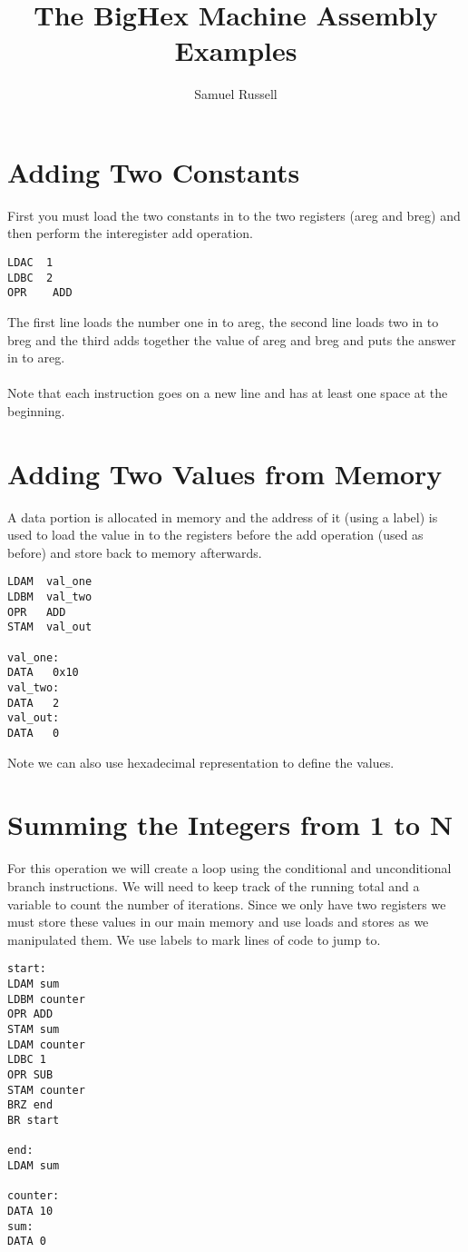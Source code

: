 \documentclass[10pt,a4paper]{article}
\author{Samuel Russell}
\title{The BigHex Machine Assembly Examples}
\begin{document}
\maketitle

\section{Adding Two Constants}

First you must load the two constants in to the two registers (areg and breg) and then perform the interegister add operation. 
\\
\begin{lstlisting}[frame=single]
LDAC  1
LDBC  2
OPR    ADD
\end{lstlisting}

The first line loads the number one in to areg, the second line loads two in to breg and the third adds together the value of areg and breg and puts the answer in to areg.
\\\\
Note that each instruction goes on a new line and has at least one space at the beginning.

\section{Adding Two Values from Memory}

A data portion is allocated in memory and the address of it (using a label) is used to load the value in to the registers before the add operation (used as before) and store back to memory afterwards.
\\
\begin{lstlisting}[frame=single]
LDAM  val_one
LDBM  val_two
OPR   ADD
STAM  val_out

val_one:
DATA   0x10
val_two:
DATA   2
val_out:
DATA   0
\end{lstlisting}

Note we can also use hexadecimal representation to define the values.
\newpage
\section{Summing the Integers from 1 to N}

For this operation we will create a loop using the conditional and unconditional branch instructions. We will need to keep track of the running total and a variable to count the number of iterations. Since we only have two registers we must store these values in our main memory and use loads and stores as we manipulated them.
We use labels to mark lines of code to jump to.
\\
\begin{lstlisting}[frame=single]
start:
LDAM sum
LDBM counter
OPR ADD
STAM sum
LDAM counter
LDBC 1
OPR SUB
STAM counter
BRZ end
BR start

end:
LDAM sum

counter:
DATA 10
sum:
DATA 0
\end{lstlisting}
\end{document}
